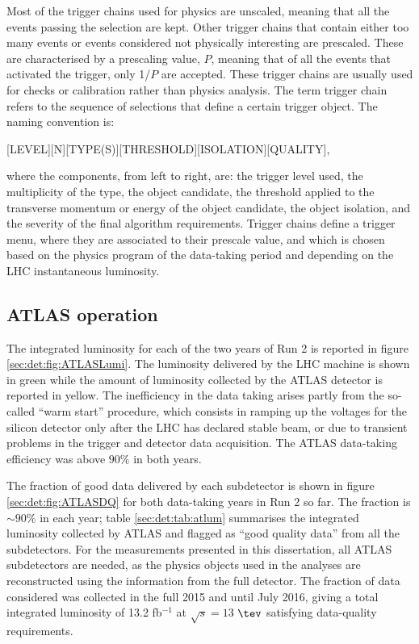 Most of the trigger chains used for physics are unscaled, meaning that all the events passing the selection are kept. Other trigger chains that contain either too many events or events considered not physically interesting are prescaled. These are characterised by a prescaling value, $P$, meaning that of all the events that activated the trigger, only 1/$P$ are accepted. These trigger chains are usually used for checks or calibration rather than physics analysis.
The term trigger chain refers to the sequence of selections that define a certain trigger object. The naming convention is:

\be
\textrm{[LEVEL][N][TYPE(S)][THRESHOLD][ISOLATION][QUALITY]},
\label{sec:det:eq:trig}
\ee


\noindent where the components, from left to right, are: the trigger level used, the multiplicity of the type, the object candidate, the threshold applied to the transverse momentum or energy of the object candidate, the object isolation, and the severity of the final algorithm requirements. Trigger chains define a trigger menu, where they are associated to their prescale value, and which is chosen based on the physics program of the data-taking period and depending on the LHC instantaneous luminosity.

\subsection{ATLAS operation}
\label{sec:det:sub:op}

The integrated luminosity for each of the two years of Run 2 is reported in figure \ref{sec:det:fig:ATLASLumi}.
The luminosity delivered by the LHC machine is shown in green while the amount of luminosity collected by the ATLAS detector is reported in yellow. The inefficiency in the data taking arises partly from the so-called ``warm start'' procedure, which consists in ramping up the voltages for the silicon detector only after the LHC has declared stable beam, or due to transient problems in the trigger and detector data acquisition. The ATLAS data-taking efficiency was above $90\%$ in both years. \par The fraction of good data delivered by each subdetector is shown in figure \ref{sec:det:fig:ATLASDQ} for both data-taking years in Run 2 so far. The fraction is $\sim90\%$ in each year; table \ref{sec:det:tab:atlum} summarises the integrated luminosity collected by ATLAS and  flagged as ``good quality data'' from all the subdetectors. For the measurements presented in this dissertation, all ATLAS subdetectors are needed, as the physics objects used in the analyses are reconstructed using the information from the full detector. The fraction of data considered was collected in the full 2015 and until July 2016, giving a total integrated luminosity of 13.2 fb$^{-1}$ at $\sqrt{s}=13$ $\tev$ satisfying data-quality requirements.


